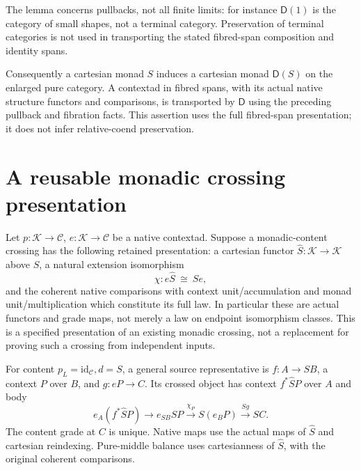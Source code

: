 \documentclass[11pt]{article}
\begin{document}
The lemma concerns pullbacks, not all finite limits: for instance $\mathsf D(1)$ is the category of small shapes, not a terminal category. Preservation of terminal categories is not used in transporting the stated fibred-span composition and identity spans.

Consequently a cartesian monad $S$ induces a cartesian monad $\mathsf D(S)$ on the enlarged pure category. A contextad in fibred spans, with its actual native structure functors and comparisons, is transported by $\mathsf D$ using the preceding pullback and fibration facts. This assertion uses the full fibred-span presentation; it does not infer relative-coend preservation.

\section{A reusable monadic crossing presentation}
Let $p:\mathcal K\to\mathcal C$, $e:\mathcal K\to\mathcal C$ be a native contextad. Suppose a monadic-content crossing has the following retained presentation: a cartesian functor $\widehat S:\mathcal K\to\mathcal K$ above $S$, a natural extension isomorphism
\[
 \chi:e\widehat S\ \cong\ S e,
\]
and the coherent native comparisons with context unit/accumulation and monad unit/multiplication which constitute its full law. In particular these are actual functors and grade maps, not merely a law on endpoint isomorphism classes. This is a specified presentation of an existing monadic crossing, not a replacement for proving such a crossing from independent inputs.

For content $p_L=\mathrm{id}_{\mathcal C},d=S$, a general source representative is $f:A\to SB$, a context $P$ over $B$, and $g:eP\to C$. Its crossed object has context $f^*\widehat SP$ over $A$ and body
\[
 e_A(f^*\widehat SP)\longrightarrow e_{SB}\widehat SP
  \xrightarrow{\chi_P}S(e_BP)\xrightarrow{Sg}SC.
\tag{M}
\]
The content grade at $C$ is unique. Native maps use the actual maps of $\widehat S$ and cartesian reindexing. Pure-middle balance uses cartesianness of $\widehat S$, with the original coherent comparisons.
\end{document}
